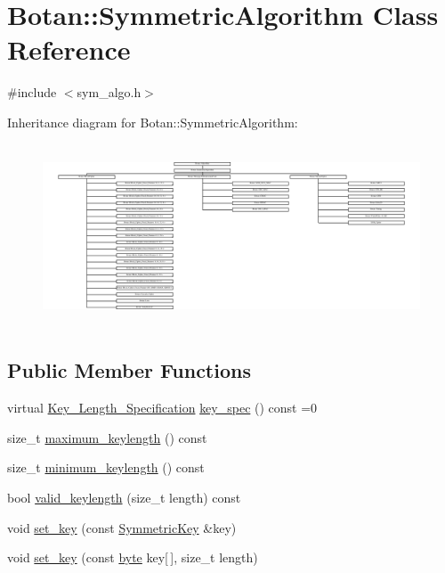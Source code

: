 \hypertarget{classBotan_1_1SymmetricAlgorithm}{\section{Botan\-:\-:Symmetric\-Algorithm Class Reference}
\label{classBotan_1_1SymmetricAlgorithm}
}


{\ttfamily \#include $<$sym\-\_\-algo.\-h$>$}

Inheritance diagram for Botan\-:\-:Symmetric\-Algorithm\-:\begin{figure}[H]
\begin{center}
\leavevmode
\includegraphics[height=5.448392cm]{classBotan_1_1SymmetricAlgorithm}
\end{center}
\end{figure}
\subsection*{Public Member Functions}
\begin{DoxyCompactItemize}
\item 
virtual \hyperlink{classBotan_1_1Key__Length__Specification}{Key\-\_\-\-Length\-\_\-\-Specification} \hyperlink{classBotan_1_1SymmetricAlgorithm_aea45c0d248b3116d7a1ebbd086f14e1b}{key\-\_\-spec} () const =0
\item 
size\-\_\-t \hyperlink{classBotan_1_1SymmetricAlgorithm_a32316443511dfe99c0788fa63249d698}{maximum\-\_\-keylength} () const 
\item 
size\-\_\-t \hyperlink{classBotan_1_1SymmetricAlgorithm_aaf2692b0903723af176b061ad8c1de66}{minimum\-\_\-keylength} () const 
\item 
bool \hyperlink{classBotan_1_1SymmetricAlgorithm_a3bf45929a98b6e1077ef9934dbc30467}{valid\-\_\-keylength} (size\-\_\-t length) const 
\item 
void \hyperlink{classBotan_1_1SymmetricAlgorithm_a0e9a776fc71286862bbf56b0253a43b6}{set\-\_\-key} (const \hyperlink{namespaceBotan_a00c78597211d5c63b63e2a57ddb96d38}{Symmetric\-Key} \&key)
\item 
void \hyperlink{classBotan_1_1SymmetricAlgorithm_a180cd790aa740827f9760d26270a4234}{set\-\_\-key} (const \hyperlink{namespaceBotan_a7d793989d801281df48c6b19616b8b84}{byte} key\mbox{[}$\,$\mbox{]}, size\-\_\-t length)
\end{DoxyCompactItemize}


